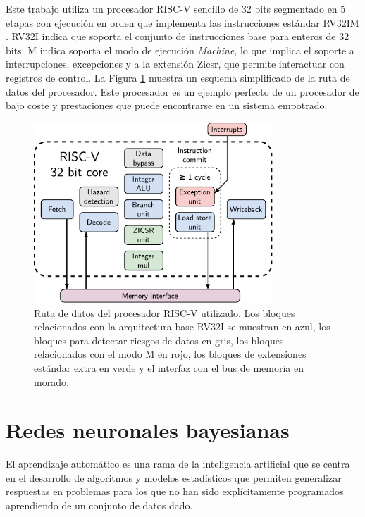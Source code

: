 Este trabajo utiliza un procesador RISC-V sencillo de 32 bits segmentado en 5 etapas con ejecución en orden que implementa las instrucciones estándar RV32IM \cite{riscv_tfg}. RV32I indica que soporta el conjunto de instrucciones base para enteros de 32 bits. M indica soporta el modo de ejecución \textit{Machine}, lo que implica el soporte a interrupciones, excepciones y a la extensión Zicsr, que permite interactuar con registros de control. La Figura \ref{fig:riscv_data_pipeline} muestra un esquema simplificado de la ruta de datos del procesador. Este procesador es un ejemplo perfecto de un procesador de bajo coste y prestaciones que puede encontrarse en un sistema empotrado.

\begin{figure}[htb]
	\centering
	\includegraphics[width=0.8\textwidth]{root/Imagenes/estado_del_arte/riscv_core.pdf}
	\caption{Ruta de datos del procesador RISC-V utilizado. Los bloques relacionados con la arquitectura base RV32I se muestran en azul, los bloques para detectar riesgos de datos en gris, los bloques relacionados con el modo M en rojo, los bloques de extensiones estándar extra en verde y el interfaz con el bus de memoria en morado.}
	\label{fig:riscv_data_pipeline}
\end{figure}

\section{Redes neuronales bayesianas}

El aprendizaje automático es una rama de la inteligencia artificial que se centra en el desarrollo de algoritmos y modelos estadísticos que permiten generalizar respuestas en problemas para los que no han sido explícitamente programados aprendiendo de un conjunto de datos dado.

